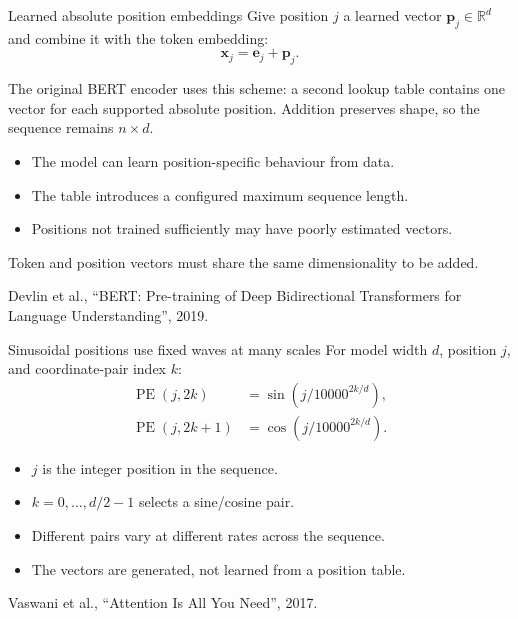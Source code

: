 \begin{frame}{Learned absolute position embeddings}
  Give position $j$ a learned vector $\mathbf{p}_j\in\mathbb{R}^{d}$ and combine it
  with the token embedding:
  \[
    \mathbf{x}_j = \mathbf{e}_j + \mathbf{p}_j.
  \]

  The original BERT encoder uses this scheme: a second lookup table contains one
  vector for each supported absolute position. Addition preserves shape, so the
  sequence remains $n\times d$.

  \begin{itemize}
    \item The model can learn position-specific behaviour from data.
    \item The table introduces a configured maximum sequence length.
    \item Positions not trained sufficiently may have poorly estimated vectors.
  \end{itemize}

  Token and position vectors must share the same dimensionality to be added.

  \vfill
  {\tiny Devlin et al., ``BERT: Pre-training of Deep Bidirectional Transformers
  for Language Understanding'', 2019.}
\end{frame}

\begin{frame}{Sinusoidal positions use fixed waves at many scales}
  For model width $d$, position $j$, and coordinate-pair index $k$:
  \begin{align*}
    \operatorname{PE}(j,2k)
      &= \sin\!\left(j/10000^{2k/d}\right),\\
    \operatorname{PE}(j,2k+1)
      &= \cos\!\left(j/10000^{2k/d}\right).
  \end{align*}

  \begin{itemize}
    \item $j$ is the integer position in the sequence.
    \item $k=0,\ldots,d/2-1$ selects a sine/cosine pair.
    \item Different pairs vary at different rates across the sequence.
    \item The vectors are generated, not learned from a position table.
  \end{itemize}

  \vfill
  {\tiny Vaswani et al., ``Attention Is All You Need'', 2017.}
\end{frame}

